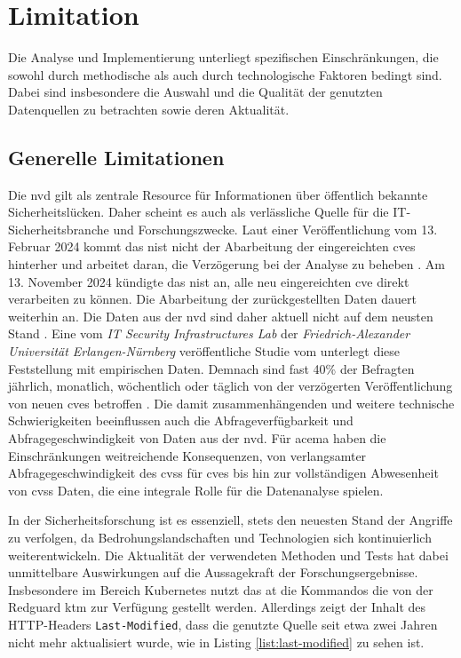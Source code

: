 \section{Limitation}
\label{sec:limitationen}
Die Analyse und Implementierung unterliegt spezifischen Einschränkungen, die sowohl durch methodische als auch durch technologische Faktoren bedingt sind. Dabei sind insbesondere die Auswahl und die Qualität der genutzten Datenquellen zu betrachten sowie deren Aktualität.
\subsection{Generelle Limitationen}
\label{limitation-generell}
\par Die \gls{nvd} gilt als zentrale Resource für Informationen über öffentlich bekannte Sicherheitslücken. Daher scheint es auch als verlässliche Quelle für die IT-Sicherheitsbranche und Forschungszwecke. Laut einer Veröffentlichung vom 13. Februar 2024 kommt das \gls{nist} nicht der Abarbeitung der eingereichten \glspl{cve} hinterher und arbeitet daran, die Verzögerung bei der Analyse zu beheben \autocite{NVDProgramAnnouncement}. Am 13. November 2024 kündigte das \gls{nist} an, alle neu eingereichten \gls{cve} direkt verarbeiten zu können. Die Abarbeitung der zurückgestellten Daten dauert weiterhin an. Die Daten aus der \gls{nvd} sind daher aktuell  nicht auf dem neusten Stand \autocite{NationalVulnerabilityDatabase2024}. Eine vom \textit{IT Security Infrastructures Lab} der \textit{Friedrich-Alexander Universität Erlangen-Nürnberg} veröffentliche Studie vom  unterlegt diese Feststellung mit empirischen Daten. Demnach sind fast 40\% der Befragten jährlich, monatlich, wöchentlich oder täglich von der verzögerten Veröffentlichung von neuen \glspl{cve} betroffen \autocite{wunderNVDUsersAttitudes2024}. Die damit zusammenhängenden und weitere technische Schwierigkeiten beeinflussen auch die Abfrageverfügbarkeit und Abfragegeschwindigkeit von Daten aus der \gls{nvd}. Für \gls{acema} haben die Einschränkungen weitreichende Konsequenzen, von verlangsamter Abfragegeschwindigkeit des \gls{cvss} für \glspl{cve} bis hin zur vollständigen Abwesenheit von \gls{cvss} Daten, die eine integrale Rolle für die Datenanalyse spielen.
%
\par In der Sicherheitsforschung ist es essenziell, stets den neuesten Stand der Angriffe zu verfolgen, da Bedrohungslandschaften und Technologien sich kontinuierlich weiterentwickeln. Die Aktualität der verwendeten Methoden und Tests hat dabei unmittelbare Auswirkungen auf die Aussagekraft der Forschungsergebnisse. Insbesondere im Bereich Kubernetes nutzt das \gls{at} die Kommandos die von der Redguard \gls{ktm} zur Verfügung gestellt werden. Allerdings zeigt der Inhalt des HTTP-Headers \verb|Last-Modified|, dass die genutzte Quelle seit etwa zwei Jahren nicht mehr aktualisiert wurde, wie in Listing \ref{list:last-modified} zu sehen ist.

